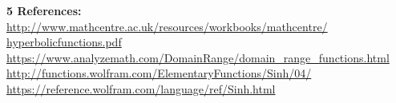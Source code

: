 \documentclass[a4paper,10pt]{article}
\begin{document}
{\Large\textbf{5 References:}\\}
\newline\indent\indent
{\fontsize{12}{12} \url{http://www.mathcentre.ac.uk/resources/workbooks/mathcentre/}\\}\indent\indent
{\fontsize{12}{12}\selectfont \url{hyperbolicfunctions.pdf}\\}
\newline\indent\indent
{\fontsize{12}{12} \url {https://www.analyzemath.com/DomainRange/domain_range_functions.html} \\}
\newline\indent\indent
{\fontsize{12}{12} \url {http://functions.wolfram.com/ElementaryFunctions/Sinh/04/} \\}
\newline\indent\indent
{\fontsize{12}{12} \url {https://reference.wolfram.com/language/ref/Sinh.html} \\}
\end{document}
